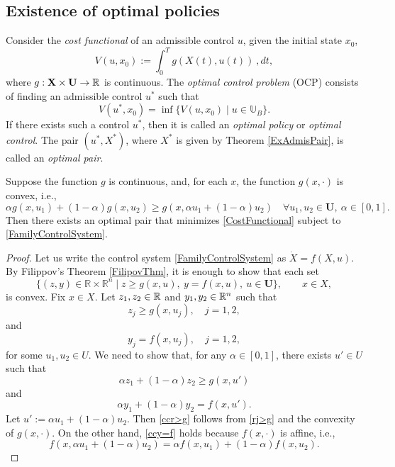 \begin{theorem}
\subsection{Existence of optimal policies}
Consider the  {\it cost functional} of an admissible control $u$, given the initial state $x_0$, 
\begin{equation}\label{CostFunctional} 
    V(u,x_0) := \int_0 ^ T g(X(t), u(t)) \ ,dt,
\end{equation}
%
where $g: \mathbf{X} \times \mathbf{U} \to \mathbb{R}$ is continuous. 
The {\it optimal control problem} (OCP) consists of finding an admissible control $u^\ast$ such that
\[ V(u^\ast,x_0)=\inf\{ V(u,x_0)\mid u\in \mathbb{U}_B \}.\]
If there exists such a control $u^\ast$, then it is called an 
{\it optimal policy} or {\it optimal control}. 
The pair $(u^\ast,X^\ast)$, where $X^\ast$ is given by 
Theorem \ref{ExAdmisPair}, is called an {\it optimal pair}.

\begin{theorem} 
Suppose the function $g$ is continuous, and, for each $x$,  
the function $g(x,\cdot)$ is convex, i.e.,
\[  
    \alpha g(x,u_1) +(1-\alpha) g(x,u_2) \geq g(x,\alpha u_1+(1-\alpha)u_2) \quad \forall u_1,u_2\in\mathbf{U},\  \alpha\in [0,1]. 
\]
Then there exists an optimal pair that minimizes \eqref{CostFunctional} subject to \eqref{FamilyControlSystem}. 
\end{theorem}
\begin{proof}
    Let us write the control system \eqref{FamilyControlSystem} as $\dot{X}=f(X,u)$. 
    By Filippov's Theorem \ref{FilipovThm}, it is enough to show that each set   
    \[ 
        \{ (z, y)\in \mathbb{R}\times \mathbb{R}^n\mid  
        z \geq g(x,u), \  y=f(x,u), \ u\in \mathbf{U}\},\qquad x\in X,
     \]  
    is convex. Fix $x\in X$. Let  $z_1,z_2\in \mathbb{R}$ and  $y_1,y_2\in \mathbb{R}^n$ such that
    \begin{equation}\label{rj>g}
         z_j\geq g(x,u_j),\quad   j=1,2, 
    \end{equation}
    and 
    \begin{equation}\label{yj=f}
        y_j=f(x,u_j),\quad j=1,2, 
    \end{equation}
    for some $u_1,u_2\in U$. 
    We need to show that, for any $\alpha\in[0,1]$, there exists $u'\in U$ such that
    \begin{equation}\label{ccr>g}
    \alpha z_1 + (1-\alpha)z_2 \geq g(x,u') \end{equation}
    and 
    \begin{equation}\label{ccy=f}
        \alpha y_1 + (1-\alpha)y_2 = f(x,u'). 
    \end{equation}
    Let $u':=\alpha u_1 + (1-\alpha)u_2$. 
    Then \eqref{ccr>g} follows from \eqref{rj>g} and the convexity of $g(x,\cdot)$. 
    On the other hand, \eqref{ccy=f} holds because $f(x,\cdot)$ is affine, i.e.,  
    \[ 
        f(x,\alpha u_1+(1-\alpha)u_2) 
        = \alpha f(x,u_1) +(1-\alpha) f(x,u_2). 
    \]
\end{proof}


\end{theorem}

